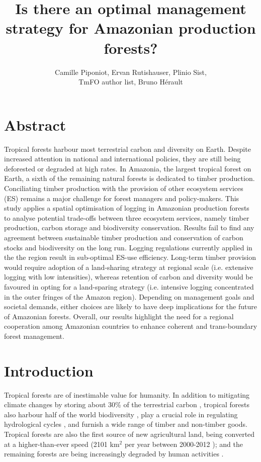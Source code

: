 \documentclass{article}
\title{Is there an optimal management strategy for Amazonian production forests?}
\author{Camille Piponiot, Ervan Rutishauser, Plinio Sist,\\ TmFO author list, Bruno Hérault}
\date{}
\begin{document}
\maketitle 

\section{Abstract}

Tropical forests harbour most terrestrial carbon and diversity on Earth. Despite increased attention in national and international policies, they are still being deforested or degraded at high rates. 
In Amazonia, the largest tropical forest on Earth, a sixth of the remaining natural forests is dedicated to timber production. Conciliating timber production with the provision of other ecosystem services (ES) remains a major challenge for forest managers and policy-makers. This study applies a spatial optimisation of logging in Amazonian production forests to analyse potential trade-offs between three ecosystem services, namely timber production, carbon storage and biodiversity conservation.  
Results fail to find any agreement between sustainable timber production and conservation of carbon stocks and biodiversity on the long run. Logging regulations currently applied in the the region result in sub-optimal ES-use efficiency. Long-term timber provision would require adoption of a land-sharing strategy at regional scale (i.e. extensive logging with low intensities), whereas retention of carbon and diversity would be favoured in opting for a land-sparing strategy (i.e. intensive logging concentrated in the outer fringes of the Amazon region). Depending on management goals and societal demands, either choices are likely to have deep implications for the future of Amazonian forests. Overall, our results highlight the need for a regional cooperation among Amazonian countries to enhance coherent and trans-boundary forest management.

\section{Introduction}

Tropical forests are of inestimable value for humanity. In addition to mitigating climate changes by storing about 30\% of the terrestrial carbon \cite{Pan2013}, tropical forests also harbour half of the world biodiversity \cite{Pimm2014}, play a crucial role in regulating hydrological cycles \cite{Fisher2009a}, and furnish a wide range of timber and non-timber goods. Tropical forests are also the first source of new agricultural land, being converted at a higher-than-ever speed (2101 km$^2$ per year between 2000-2012 \cite{Hansen2013}); and the remaining forests are being increasingly degraded by human activities \cite{Potapov2017}. 
\end{document}
